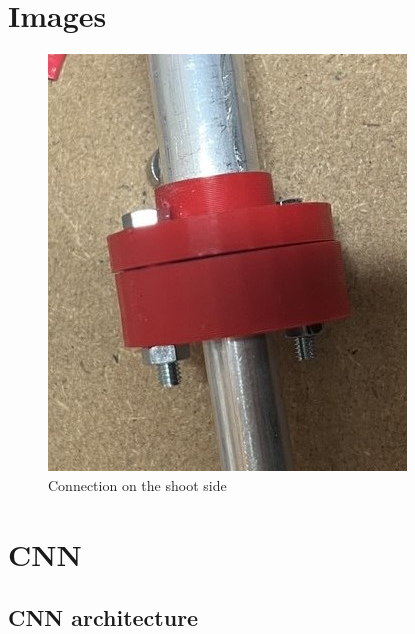 \section{Images}\label{sec:images}

\centering
\begin{figure}[h!]
    \centering
    \includegraphics[width=0.5\linewidth]{../photos/connector_tube}
    \caption{Connection on the shoot side}
    \label{fig:connector_tube}
\end{figure}


\section{CNN}\label{sec:cnn}

\subsection{CNN architecture}\label{subsec:cnn-architecture}

